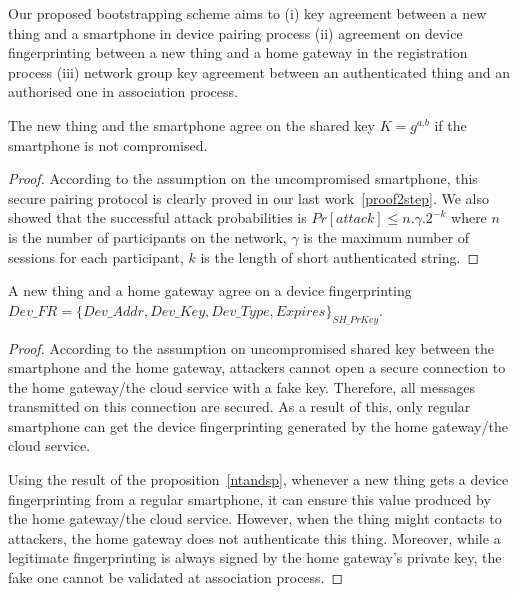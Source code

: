 Our proposed bootstrapping scheme aims to (i) key agreement between a new thing and a smartphone in device pairing process (ii) agreement on device fingerprinting between a new thing and a home gateway in the registration process (iii) network group key agreement between an authenticated thing and an authorised one in association process. 

\begin{Proposition}\label{ntandsp}
The new thing and the smartphone agree on the shared key $K= g^{a.b}$ if the smartphone is not compromised. 
\end{Proposition}

\begin{proof}

According to the assumption on the uncompromised smartphone, this secure pairing protocol is clearly proved in our last work~\ref{proof2step}. We also showed that the successful attack probabilities is $Pr[attack] \leq n.\gamma.2^{-k}$ where $n$ is the number of participants on the network, $\gamma$ is the maximum number of sessions for each participant, $k$ is the length of short authenticated string.
\end{proof}

\begin{Proposition}\label{newandsh}
A new thing and a home gateway agree on a device fingerprinting $Dev\_FR = \{Dev\_Addr, Dev\_Key, Dev\_Type, Expires\}_{SH\_PrKey}$. 
\end{Proposition}

\begin{proof}

According to the assumption on uncompromised shared key between the smartphone and the home gateway, attackers cannot open a secure connection to the home gateway/the cloud service with a fake key. Therefore, all messages transmitted on this connection are secured. As a result of this, only regular smartphone can get the device fingerprinting generated by the home gateway/the cloud service. 

Using the result of the proposition~\ref{ntandsp}, whenever a new thing gets a device fingerprinting from a regular smartphone, it can ensure this value produced by the home gateway/the cloud service. However, when the thing might contacts to attackers, the home gateway does not authenticate this thing. Moreover, while a legitimate fingerprinting is always signed by the home gateway's private key, the fake one cannot be validated at association process. 

\end{proof}

